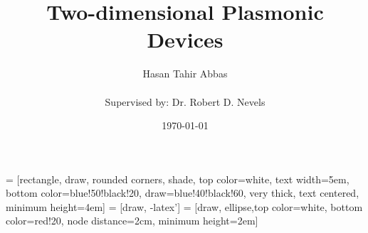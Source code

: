 \documentclass[mathserif,18pt,xcolor=table]{beamer}
\title{Two-dimensional Plasmonic Devices}
\author[Hasan Tahir Abbas]{Hasan Tahir Abbas\\~\\{\small {Supervised by: Dr. Robert D. Nevels}}}
\institute{Department of Electrical  \& Computer Engineering\\ \mbox{} \\ \pgfuseimage{tamuecenbig}}
\date[Spring 2017]{\today}
\begin{document}
\preto\subequations{\ifhmode\unskip\fi}
 = [rectangle, draw, rounded corners, shade, top color=white, text width=5em,
bottom color=blue!50!black!20, draw=blue!40!black!60, very thick, text centered, minimum height=4em]
 = [draw, -latex']
 = [draw, ellipse,top color=white, bottom color=red!20, node distance=2cm, minimum height=2em]

\beamertemplateballitem

\frame{\titlepage}


%
%
\end{document}
